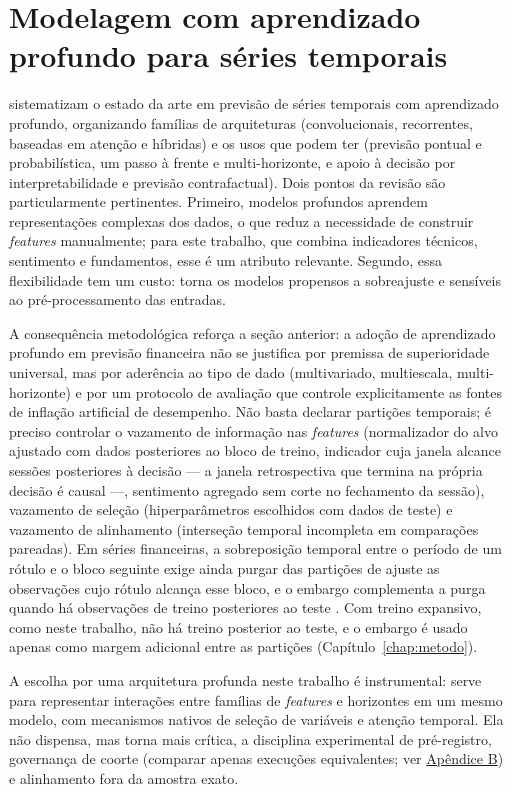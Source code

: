 \section{Modelagem com aprendizado profundo para séries temporais}
 sistematizam o estado da arte em previsão de séries temporais com aprendizado profundo, organizando famílias de arquiteturas (convolucionais, recorrentes, baseadas em atenção e híbridas) e os usos que podem ter (previsão pontual e probabilística, um passo à frente e multi-horizonte, e apoio à decisão por interpretabilidade e previsão contrafactual). Dois pontos da revisão são particularmente pertinentes. Primeiro, modelos profundos aprendem representações complexas dos dados, o que reduz a necessidade de construir \textit{features} manualmente; para este trabalho, que combina indicadores técnicos, sentimento e fundamentos, esse é um atributo relevante. Segundo, essa flexibilidade tem um custo: torna os modelos propensos a sobreajuste e sensíveis ao pré-processamento das entradas.

A consequência metodológica reforça a seção anterior: a adoção de aprendizado profundo em previsão financeira não se justifica por premissa de superioridade universal, mas por aderência ao tipo de dado (multivariado, multiescala, multi-horizonte) e por um protocolo de avaliação que controle explicitamente as fontes de inflação artificial de desempenho. Não basta declarar partições temporais; é preciso controlar o vazamento de informação nas \textit{features} (normalizador do alvo ajustado com dados posteriores ao bloco de treino, indicador cuja janela alcance sessões posteriores à decisão --- a janela retrospectiva que termina na própria decisão é causal ---, sentimento agregado sem corte no fechamento da sessão), vazamento de seleção (hiperparâmetros escolhidos com dados de teste) e vazamento de alinhamento (interseção temporal incompleta em comparações pareadas). Em séries financeiras, a sobreposição temporal entre o período de um rótulo e o bloco seguinte exige ainda purgar das partições de ajuste as observações cujo rótulo alcança esse bloco, e o embargo complementa a purga quando há observações de treino posteriores ao teste \cite{LOPEZDEPRADO2018JPM}. Com treino expansivo, como neste trabalho, não há treino posterior ao teste, e o embargo é usado apenas como margem adicional entre as partições (Capítulo~\ref{chap:metodo}).

A escolha por uma arquitetura profunda neste trabalho é instrumental: serve para representar interações entre famílias de \textit{features} e horizontes em um mesmo modelo, com mecanismos nativos de seleção de variáveis e atenção temporal. Ela não dispensa, mas torna mais crítica, a disciplina experimental de pré-registro, governança de coorte (comparar apenas execuções equivalentes; ver \hyperref[gl:coorte]{Apêndice B}) e alinhamento fora da amostra exato.

